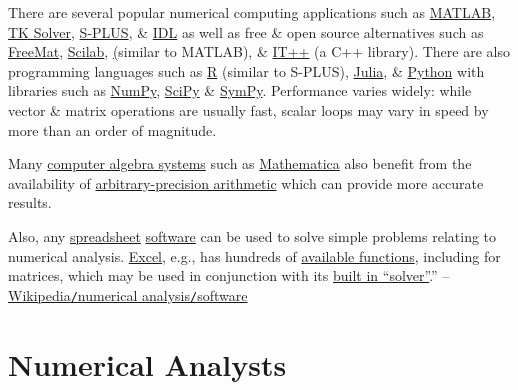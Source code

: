 \documentclass[oneside]{book}
\numberwithin{equation}{section}
\begin{document}
There are several popular numerical computing applications such as \href{https://en.wikipedia.org/wiki/MATLAB}{MATLAB}, \href{https://en.wikipedia.org/wiki/TK_Solver}{TK Solver}, \href{https://en.wikipedia.org/wiki/S-PLUS}{S-PLUS}, \& \href{https://en.wikipedia.org/wiki/IDL_(programming_language)}{IDL} as well as free \& open source alternatives such as \href{https://en.wikipedia.org/wiki/FreeMat}{FreeMat}, \href{https://en.wikipedia.org/wiki/Scilab}{Scilab}, \href{GNU Octave} (similar to MATLAB), \& \href{https://en.wikipedia.org/wiki/IT%2B%2B}{IT++} (a C++ library). There are also programming languages such as \href{https://en.wikipedia.org/wiki/R_(programming_language)}{R} (similar to S-PLUS), \href{https://en.wikipedia.org/wiki/Julia_(programming_language)}{Julia}, \& \href{https://en.wikipedia.org/wiki/Python_(programming_language)}{Python} with libraries such as \href{https://en.wikipedia.org/wiki/NumPy}{NumPy}, \href{https://en.wikipedia.org/wiki/SciPy}{SciPy} \& \href{https://en.wikipedia.org/wiki/SymPy}{SymPy}. Performance varies widely: while vector \& matrix operations are usually fast, scalar loops may vary in speed by more than an order of magnitude.

Many \href{https://en.wikipedia.org/wiki/Computer_algebra_system}{computer algebra systems} such as \href{https://en.wikipedia.org/wiki/Mathematica}{Mathematica} also benefit from the availability of \href{https://en.wikipedia.org/wiki/Arbitrary-precision_arithmetic}{arbitrary-precision arithmetic} which can provide more accurate results.

Also, any \href{https://en.wikipedia.org/wiki/Spreadsheet}{spreadsheet} \href{https://en.wikipedia.org/wiki/Software}{software} can be used to solve simple problems relating to numerical analysis. \href{https://en.wikipedia.org/wiki/Microsoft_Excel}{Excel}, e.g., has hundreds of \href{https://en.wikipedia.org/wiki/Microsoft_Excel#Functions}{available functions}, including for matrices, which may be used in conjunction with its \href{https://en.wikipedia.org/wiki/Microsoft_Excel#Add-ins}{built in ``solver''}.'' -- \href{https://en.wikipedia.org/wiki/Numerical_analysis#Software}{Wikipedia\texttt{/}numerical analysis\texttt{/}software}


\chapter{Numerical Analysts}
\end{document}
